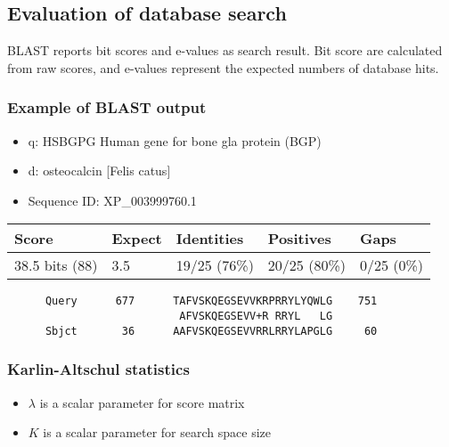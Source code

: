 %
%

%
%
\subsection{Evaluation of database search}
BLAST reports bit scores and e-values as search result. Bit score are calculated from raw scores, and e-values represent the expected numbers of database hits.

%
%
\subsubsection*{Example of BLAST output} 
\begin{itemize}
\item q: HSBGPG Human gene for bone gla protein (BGP)
\item d: osteocalcin [Felis catus]
\item Sequence ID: XP\_003999760.1
\end{itemize}

%
%
\newpage

\begin{table}[H]
\centering
\begin{tabular}{lllll}
\textbf{Score} & \textbf{Expect} & \textbf{Identities} & \textbf{Positives} & \textbf{Gaps} \\ \hline
38.5 bits (88)  & 3.5             & 19/25 (76\%)         & 20/25 (80\%)        & 0/25 (0\%)    
\end{tabular}
\end{table}

\begin{verbatim}
      Query      677      TAFVSKQEGSEVVKRPRRYLYQWLG    751
                           AFVSKQEGSEVV+R RRYL   LG	
      Sbjct       36      AAFVSKQEGSEVVRRLRRYLAPGLG     60
\end{verbatim}

%
%
\subsubsection*{Karlin-Altschul statistics} 
\begin{itemize}
\item $\lambda$ is a scalar parameter for score matrix 
\item $K$ is a scalar parameter for search space size
\end{itemize}

